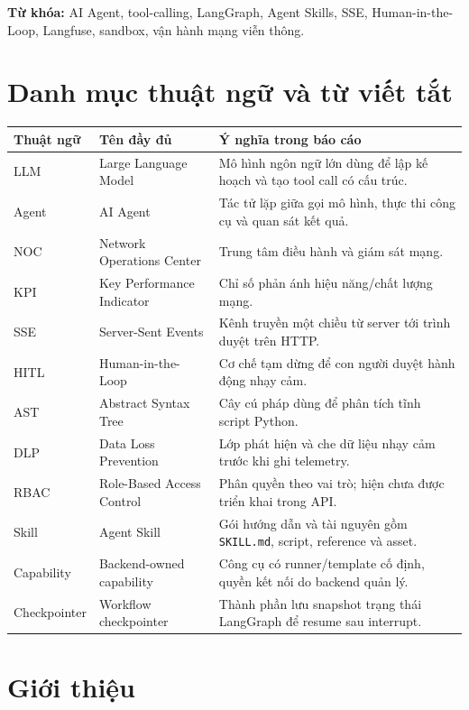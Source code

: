 \documentclass[12pt,a4paper]{article}
\begin{document}
\noindent\textbf{Từ khóa:} AI Agent, tool-calling, LangGraph, Agent Skills, SSE, Human-in-the-Loop, Langfuse, sandbox, vận hành mạng viễn thông.

\clearpage
\tableofcontents
\clearpage
\listoffigures
\clearpage
\listoftables
\clearpage
\section*{Danh mục thuật ngữ và từ viết tắt}
\begin{longtable}{p{}p{}p{}}
\toprule
\textbf{Thuật ngữ} & \textbf{Tên đầy đủ} & \textbf{Ý nghĩa trong báo cáo} \\
\midrule
LLM & Large Language Model & Mô hình ngôn ngữ lớn dùng để lập kế hoạch và tạo tool call có cấu trúc. \\
Agent & AI Agent & Tác tử lặp giữa gọi mô hình, thực thi công cụ và quan sát kết quả. \\
NOC & Network Operations Center & Trung tâm điều hành và giám sát mạng. \\
KPI & Key Performance Indicator & Chỉ số phản ánh hiệu năng/chất lượng mạng. \\
SSE & Server-Sent Events & Kênh truyền một chiều từ server tới trình duyệt trên HTTP. \\
HITL & Human-in-the-Loop & Cơ chế tạm dừng để con người duyệt hành động nhạy cảm. \\
AST & Abstract Syntax Tree & Cây cú pháp dùng để phân tích tĩnh script Python. \\
DLP & Data Loss Prevention & Lớp phát hiện và che dữ liệu nhạy cảm trước khi ghi telemetry. \\
RBAC & Role-Based Access Control & Phân quyền theo vai trò; hiện chưa được triển khai trong API. \\
Skill & Agent Skill & Gói hướng dẫn và tài nguyên gồm \texttt{SKILL.md}, script, reference và asset. \\
Capability & Backend-owned capability & Công cụ có runner/template cố định, quyền kết nối do backend quản lý. \\
Checkpointer & Workflow checkpointer & Thành phần lưu snapshot trạng thái LangGraph để resume sau interrupt. \\
\bottomrule
\end{longtable}

\clearpage
{}

\section{Giới thiệu}
\end{document}
